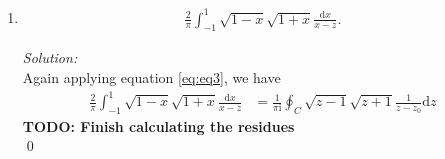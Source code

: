 \documentclass[10pt]{amsart}
\newcommand{\D}{\mathrm{d}}
\newcommand{\I}{\mathrm{i}}
\theoremstyle{nonumberplain}
\begin{document}
\begin{enumerate}[label={\bf {\arabic*}:}]
\begin{enumerate}
\item 
\begin{align*}
\frac{2}{\pi}\int_{-1}^1 {\sqrt{1-x} \sqrt{1 + x}} \frac{\D x}{x -z}.
\end{align*}

\textit{Solution:} \\
Again applying equation \eqref{eq:eq3}, we have
\begin{align*}
\frac{2}{\pi}\int_{-1}^1 {\sqrt{1-x} \sqrt{1 + x}} \frac{\D x}{x -z}
	&= \frac 1 {\pi \I} \oint_C \sqrt {z - 1} \sqrt {z + 1} \frac 1 {z - z_0} \D z
\end{align*} 
\textbf{TODO: Finish calculating the residues} \\
\qed \\


\end{enumerate}

      
    


  
\end{enumerate}
\end{document}
